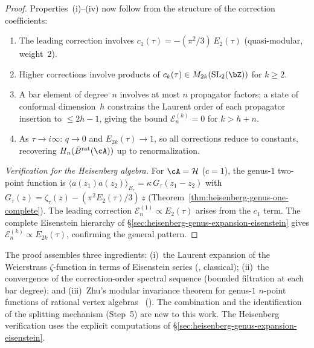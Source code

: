 \begin{proof}
Properties~(i)--(iv) now follow from the structure of the correction
coefficients:
\begin{enumerate}[label=(\roman*)]
\item The leading correction involves $c_1(\tau) = -(\pi^2/3)\,E_2(\tau)$
(quasi-modular, weight~$2$).
\item Higher corrections involve products of
$c_k(\tau) \in M_{2k}(\mathrm{SL}_2(\bZ))$ for $k \geq 2$.
\item A bar element of degree~$n$ involves at most $n$ propagator
factors; a state of conformal dimension~$h$ constrains the Laurent
order of each propagator insertion to $\leq 2h - 1$, giving the bound
$\mathcal{E}^{(k)}_n = 0$ for $k > h + n$.
\item As $\tau \to i\infty$: $q \to 0$ and $E_{2k}(\tau) \to 1$, so all
corrections reduce to constants, recovering $H_n(\bar{B}^{\mathrm{rat}}(\cA))$
up to renormalization.
\end{enumerate}

\emph{Verification for the Heisenberg algebra.}
For $\cA = \mathcal{H}$ ($c = 1$), the genus-$1$ two-point function is
$\langle a(z_1)a(z_2)\rangle_{E_\tau} = \kappa\,G_\tau(z_1 - z_2)$
with $G_\tau(z) = \zeta_\tau(z) - (\pi^2 E_2(\tau)/3)\,z$
(Theorem~\ref{thm:heisenberg-genus-one-complete}). The leading
correction $\mathcal{E}^{(1)}_n \propto E_2(\tau)$ arises from the
$c_1$ term. The complete Eisenstein hierarchy of
\S\ref{sec:heisenberg-genus-expansion-eisenstein} gives
$\mathcal{E}^{(k)}_n \propto E_{2k}(\tau)$, confirming the general
pattern.
\end{proof}

\begin{remark}[Scope]
The proof assembles three ingredients:
(i)~the Laurent expansion of the Weierstrass $\zeta$-function in
terms of Eisenstein series (\ClaimStatusProvedElsewhere, classical);
(ii)~the convergence of the correction-order spectral sequence
(bounded filtration at each bar degree); and
(iii)~Zhu's modular invariance theorem for genus-$1$ $n$-point
functions of rational vertex algebras~\cite{Zhu96}
(\ClaimStatusProvedElsewhere). The combination and the identification
of the splitting mechanism (Step~5) are new to this work.
The Heisenberg verification uses the explicit computations of
\S\ref{sec:heisenberg-genus-expansion-eisenstein}.
\end{remark}



